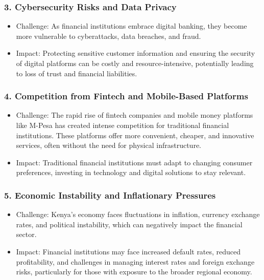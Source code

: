 \documentclass[10pt]{article}
\begin{document}
\subsubsection*{3. Cybersecurity Risks and Data Privacy}
\begin{itemize}
  \item Challenge: As financial institutions embrace digital banking, they become more vulnerable to cyberattacks, data breaches, and fraud.
  \item Impact: Protecting sensitive customer information and ensuring the security of digital platforms can be costly and resource-intensive, potentially leading to loss of trust and financial liabilities.
\end{itemize}

\subsubsection*{4. Competition from Fintech and Mobile-Based Platforms}
\begin{itemize}
  \item Challenge: The rapid rise of fintech companies and mobile money platforms like M-Pesa has created intense competition for traditional financial institutions. These platforms offer more convenient, cheaper, and innovative services, often without the need for physical infrastructure.
  \item Impact: Traditional financial institutions must adapt to changing consumer preferences, investing in technology and digital solutions to stay relevant.
\end{itemize}

\subsubsection*{5. Economic Instability and Inflationary Pressures}
\begin{itemize}
  \item Challenge: Kenya's economy faces fluctuations in inflation, currency exchange rates, and political instability, which can negatively impact the financial sector.
  \item Impact: Financial institutions may face increased default rates, reduced profitability, and challenges in managing interest rates and foreign exchange risks, particularly for those with exposure to the broader regional economy.
\end{itemize}
\end{document}
